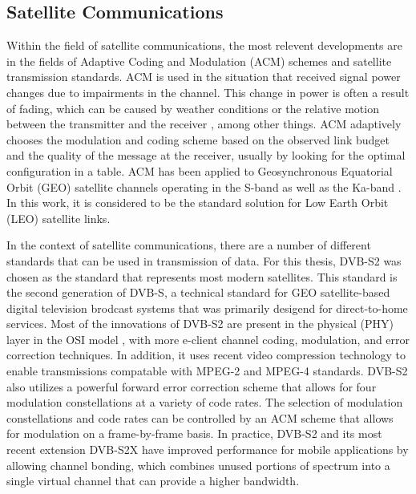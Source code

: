 \subsection{Satellite Communications}
\par Within the field of satellite communications, the most relevent developments are in the fields of Adaptive Coding and Modulation (ACM) schemes and satellite transmission standards.  ACM is used in the situation that received signal power changes due to impairments in the channel\cite{acm_explained}. This change in power is often a result of fading, which can be caused by weather conditions or the relative motion between the transmitter and the receiver \cite{paulo17}, among other things. ACM adaptively chooses the modulation and coding scheme based on the observed link budget and the quality of the message at the receiver, usually by looking for the optimal configuration in a table. ACM has been applied to 
Geosynchronous Equatorial Orbit (GEO) satellite channels operating in the S-band \cite{paulo18} as well as the Ka-band \cite{paulo19}. In this work, it is considered to be the standard solution for Low Earth Orbit (LEO) satellite links.  
\par In the context of satellite communications, there are a number of different standards that can be used in transmission of data. For this thesis, DVB-S2 \cite{paulo21} was chosen as the standard that represents most modern satellites. This standard is the second generation of DVB-S, a technical standard for GEO satellite-based digital television brodcast systems that was primarily desigend for direct-to-home services. Most of the innovations of DVB-S2 are present in the physical (PHY) layer in the OSI model \cite{OSIModel}, with more e-client channel coding, modulation, and error correction techniques. In addition, it uses recent video compression technology to enable transmissions compatable with MPEG-2 and MPEG-4 \cite{mpeg4} standards. DVB-S2 also utilizes a powerful forward error correction scheme that allows for four modulation constellations at a variety of code rates. The selection of modulation constellations and code rates can be controlled by an ACM scheme that allows for modulation on a frame-by-frame basis. In practice, DVB-S2 and its most recent extension DVB-S2X \cite{paulo22} have improved performance for mobile applications by allowing channel bonding, which combines unused portions of spectrum into a single virtual channel that can provide a higher bandwidth.
